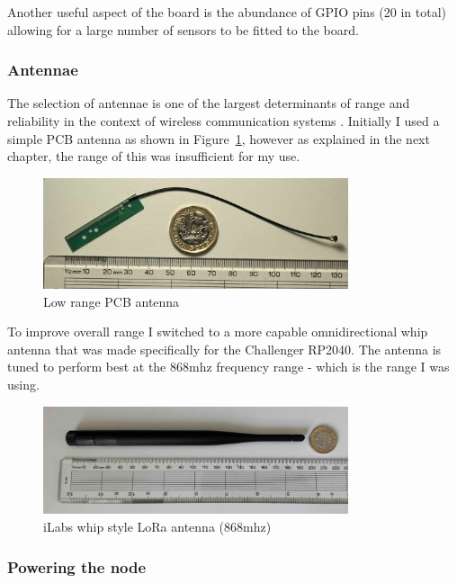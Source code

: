 Another useful aspect of the board is the abundance of GPIO pins (20 in total)
allowing for a large number of sensors to be fitted to the board.

\subsubsection{Antennae}

The selection of antennae is one of the largest determinants of range and
reliability in the context of wireless communication systems \cite{khan2016}.
Initially I used a simple PCB antenna as shown in Figure~\ref{fig:pcb-antenna},
however as explained in the next chapter, the range of this was insufficient for
my use.

\begin{figure}[H]
    \centering
    \includegraphics[width=0.8\textwidth]{contents/part-2/fig2/basic-antenna.jpg}
    \caption{Low range PCB antenna}
    \label{fig:pcb-antenna}
\end{figure}

To improve overall range I switched to a more capable omnidirectional whip
antenna that was made specifically for the Challenger RP2040. The antenna is
tuned to perform best at the 868mhz frequency range - which is the range I was
using.

\begin{figure}[H]
    \centering
    \includegraphics[width=0.8\textwidth]{contents/part-2/fig2/good-antenna.jpg}
    \caption{iLabs whip style LoRa antenna (868mhz)}
    \label{fig:good-antenna}
\end{figure}

\subsubsection{Powering the node}

